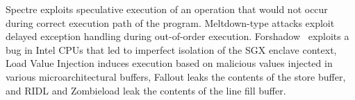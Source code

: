 Spectre \cite{kocher2020spectre} exploits speculative execution of an operation that would not occur during correct execution path of the program. Meltdown-type attacks \cite{meltdown} exploit delayed
exception handling during out-of-order execution.
Forshadow~\cite{van2018foreshadow}
exploits a bug in Intel CPUs that led to imperfect isolation of the SGX enclave context, Load Value Injection \cite{lvi} induces execution based on malicious values injected in various microarchitectural buffers, Fallout \cite{canella2019fallout} leaks the contents of the store buffer, and RIDL \cite{ridl} and Zombieload \cite{schwarz2019zombieload} leak the contents of the line fill buffer.


